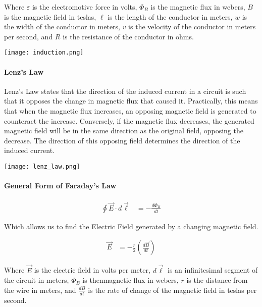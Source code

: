 Where $\varepsilon$ is the electromotive force in volts, $\Phi_B$ is the magnetic flux in webers, $B$ is the magnetic field in teslas, $\ell$ is the length of the conductor in meters, $w$ is the width of the conductor in meters, $v$ is the velocity of the conductor in meters per second, and $R$ is the resistance of the conductor in ohms.\\

\begin{center}
    \texttt{[image: induction.png]}
\end{center}

\paragraph*{Lenz's Law}
Lenz's Law states that the direction of the induced current in a circuit is such that it opposes the change in magnetic flux that caused it. 
Practically, this means that when the magnetic flux increases, an opposing magnetic field is generated to counteract the increase. 
Conversely, if the magnetic flux decreases, the generated magnetic field will be in the same direction as the original field, opposing the 
decrease. The direction of this opposing field determines the direction of the induced current.

\begin{center}
    \texttt{[image: lenz\_law.png]}
\end{center}


\paragraph*{General Form of Faraday's Law}

\begin{align*}
    \oint \vec{E} \cdot d\vec{\ell} &= -\frac{d\Phi_B}{dt}
\end{align*}

Which allows us to find the Electric Field generated by a changing magnetic field.

\begin{align*}
    \vec{E} &= -\frac{r}{2}(\frac{d\vec{B}}{dt})
\end{align*}

Where $\vec{E}$ is the electric field in volts per meter, $d\vec{\ell}$ is an infinitesimal segment of the circuit in meters, $\Phi_B$ is thenmagnetic flux in webers, $r$ is the distance from the wire in meters, and $\frac{dB}{dt}$ is the rate of change of the magnetic field in teslas per second.\\